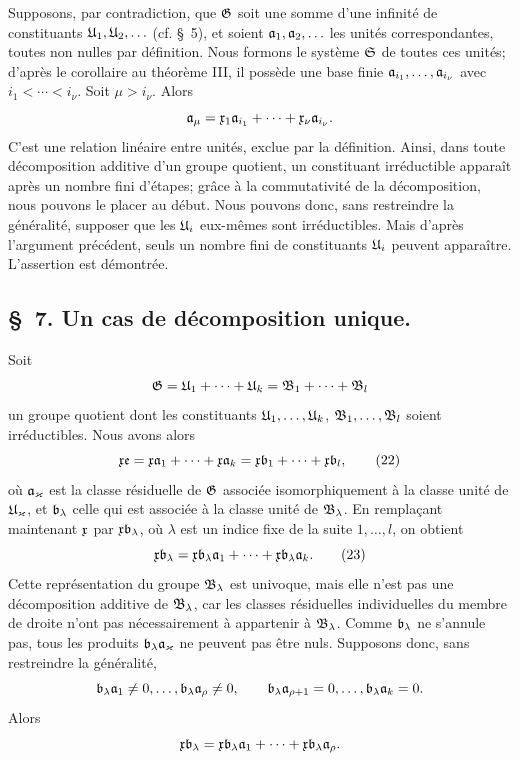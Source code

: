 Supposons, par contradiction, que $\mathfrak{G}$ soit une somme d'une infinité de constituants $\mathfrak{U}_1,\mathfrak{U}_2,\ldots$ (cf. \S~5), et soient $\mathfrak{a}_1,\mathfrak{a}_2,\ldots$ les unités correspondantes, toutes non nulles par définition. Nous formons le système $\mathfrak{S}$ de toutes ces unités; d'après le corollaire au théorème III, il possède une base finie $\mathfrak{a}_{i_1},\ldots,\mathfrak{a}_{i_\nu}$ avec $i_1<\cdots<i_\nu$. Soit $\mu>i_\nu$. Alors
\[
 \mathfrak{a}_\mu=\mathfrak{x}_1\mathfrak{a}_{i_1}+\cdots+\mathfrak{x}_\nu\mathfrak{a}_{i_\nu}.
\]
C'est une relation linéaire entre unités, exclue par la définition. Ainsi, dans toute décomposition additive d'un groupe quotient, un constituant irréductible apparaît après un nombre fini d'étapes; grâce à la commutativité de la décomposition, nous pouvons le placer au début. Nous pouvons donc, sans restreindre la généralité, supposer que les $\mathfrak{U}_i$ eux-mêmes sont irréductibles. Mais d'après l'argument précédent, seuls un nombre fini de constituants $\mathfrak{U}_i$ peuvent apparaître. L'assertion est démontrée.

\subsection*{\S~7. Un cas de décomposition unique.}

Soit
\[
 \mathfrak{G}=\mathfrak{U}_1+\cdots+\mathfrak{U}_k=\mathfrak{B}_1+\cdots+\mathfrak{B}_l
\]
un groupe quotient dont les constituants $\mathfrak{U}_1,\ldots,\mathfrak{U}_k$, $\mathfrak{B}_1,\ldots,\mathfrak{B}_l$ soient irréductibles. Nous avons alors
\begin{equation}
 \mathfrak{x}\mathfrak{e}=\mathfrak{x}\mathfrak{a}_1+\cdots+\mathfrak{x}\mathfrak{a}_k
 =\mathfrak{x}\mathfrak{b}_1+\cdots+\mathfrak{x}\mathfrak{b}_l,
\tag{22}
\end{equation}
où $\mathfrak{a}_\varkappa$ est la classe résiduelle de $\mathfrak{G}$ associée isomorphiquement à la classe unité de $\mathfrak{U}_\varkappa$, et $\mathfrak{b}_\lambda$ celle qui est associée à la classe unité de $\mathfrak{B}_\lambda$. En remplaçant maintenant $\mathfrak{x}$ par $\mathfrak{x}\mathfrak{b}_\lambda$, où $\lambda$ est un indice fixe de la suite $1,\ldots,l$, on obtient
\begin{equation}
 \mathfrak{x}\mathfrak{b}_\lambda=\mathfrak{x}\mathfrak{b}_\lambda\mathfrak{a}_1+\cdots+\mathfrak{x}\mathfrak{b}_\lambda\mathfrak{a}_k.
\tag{23}
\end{equation}
Cette représentation du groupe $\mathfrak{B}_\lambda$ est univoque, mais elle n'est pas une décomposition additive de $\mathfrak{B}_\lambda$, car les classes résiduelles individuelles du membre de droite n'ont pas nécessairement à appartenir à $\mathfrak{B}_\lambda$. Comme $\mathfrak{b}_\lambda$ ne s'annule pas, tous les produits $\mathfrak{b}_\lambda\mathfrak{a}_\varkappa$ ne peuvent pas être nuls. Supposons donc, sans restreindre la généralité,
\[
 \mathfrak{b}_\lambda\mathfrak{a}_1\ne0,
 \ldots,
 \mathfrak{b}_\lambda\mathfrak{a}_\rho\ne0,
 \qquad
 \mathfrak{b}_\lambda\mathfrak{a}_{\rho+1}=0,
 \ldots,
 \mathfrak{b}_\lambda\mathfrak{a}_k=0.
\]
Alors
\[
 \mathfrak{x}\mathfrak{b}_\lambda=\mathfrak{x}\mathfrak{b}_\lambda\mathfrak{a}_1+\cdots+\mathfrak{x}\mathfrak{b}_\lambda\mathfrak{a}_\rho.
\]

